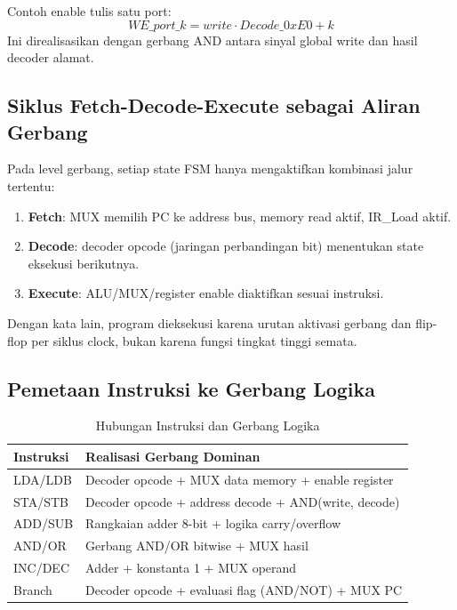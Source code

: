 \documentclass[12pt,a4paper]{report}
\begin{document}
Contoh enable tulis satu port:
\[
WE\_{port\_k} = write \cdot Decode\_{0xE0+k}
\]
Ini direalisasikan dengan gerbang AND antara sinyal global write dan hasil decoder alamat.

\subsection{Siklus Fetch-Decode-Execute sebagai Aliran Gerbang}

Pada level gerbang, setiap state FSM hanya mengaktifkan kombinasi jalur tertentu:
\begin{enumerate}
  \item \textbf{Fetch}: MUX memilih PC ke address bus, memory read aktif, IR\_Load aktif.
  \item \textbf{Decode}: decoder opcode (jaringan perbandingan bit) menentukan state eksekusi berikutnya.
  \item \textbf{Execute}: ALU/MUX/register enable diaktifkan sesuai instruksi.
\end{enumerate}

Dengan kata lain, program dieksekusi karena urutan aktivasi gerbang dan flip-flop per siklus clock, bukan karena fungsi tingkat tinggi semata.

\subsection{Pemetaan Instruksi ke Gerbang Logika}

\begin{table}[H]
  \centering
  \small
  \begin{tabular}{|l|l|}
    \hline
    \textbf{Instruksi} & \textbf{Realisasi Gerbang Dominan} \\
    \hline
    LDA/LDB & Decoder opcode + MUX data memory + enable register \\
    STA/STB & Decoder opcode + address decode + AND(write, decode) \\
    ADD/SUB & Rangkaian adder 8-bit + logika carry/overflow \\
    AND/OR & Gerbang AND/OR bitwise + MUX hasil \\
    INC/DEC & Adder + konstanta 1 + MUX operand \\
    Branch & Decoder opcode + evaluasi flag (AND/NOT) + MUX PC \\
    \hline
  \end{tabular}
  \caption{Hubungan Instruksi dan Gerbang Logika}
\end{table}
\end{document}
